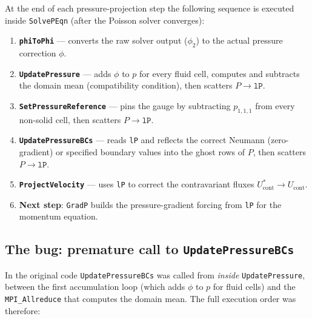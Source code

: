 \documentclass[12pt,a4paper]{article}
\begin{document}
At the end of each pressure-projection step the following sequence is
executed inside \texttt{SolvePEqn} (after the Poisson solver converges):

\begin{enumerate}
  \item \textbf{\texttt{phiToPhi}} — converts the raw solver output
        ($\phi_2$) to the actual pressure correction $\phi$.
  \item \textbf{\texttt{UpdatePressure}} — adds $\phi$ to $p$ for every
        fluid cell, computes and subtracts the domain mean (compatibility
        condition), then scatters $P \to \mathtt{lP}$.
  \item \textbf{\texttt{SetPressureReference}} — pins the gauge by
        subtracting $p_{1,1,1}$ from every non-solid cell, then
        scatters $P \to \mathtt{lP}$.
  \item \textbf{\texttt{UpdatePressureBCs}} — reads \texttt{lP} and
        reflects the correct Neumann (zero-gradient) or specified
        boundary values into the ghost rows of $P$, then scatters
        $P \to \mathtt{lP}$.
  \item \textbf{\texttt{ProjectVelocity}} — uses \texttt{lP} to correct
        the contravariant fluxes $U^*_{\text{cont}} \to U_{\text{cont}}$.
  \item \textbf{Next step}: \texttt{GradP} builds the pressure-gradient
        forcing from \texttt{lP} for the momentum equation.
\end{enumerate}

\subsection{The bug: premature call to \texttt{UpdatePressureBCs}}
\label{sec:peqn-bc-bug-desc}

In the original code \texttt{UpdatePressureBCs} was called from
\emph{inside} \texttt{UpdatePressure}, between the first accumulation
loop (which adds $\phi$ to $p$ for fluid cells) and the
\texttt{MPI\_Allreduce} that computes the domain mean.  The full
execution order was therefore:
\end{document}
